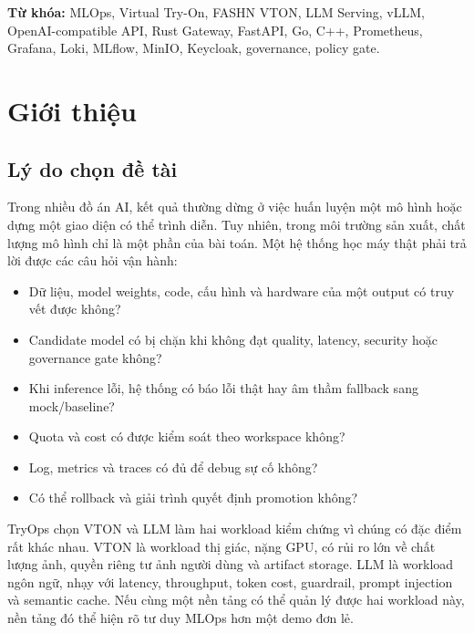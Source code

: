 \documentclass[12pt,a4paper,oneside]{report}
\begin{document}
\textbf{Từ khóa:} MLOps, Virtual Try-On, FASHN VTON, LLM Serving, vLLM, OpenAI-compatible API, Rust Gateway, FastAPI, Go, C++, Prometheus, Grafana, Loki, MLflow, MinIO, Keycloak, governance, policy gate.

\tableofcontents
\clearpage
{}

\chapter{Giới thiệu}

\section{Lý do chọn đề tài}

Trong nhiều đồ án AI, kết quả thường dừng ở việc huấn luyện một mô hình hoặc dựng một giao diện có thể trình diễn. Tuy nhiên, trong môi trường sản xuất, chất lượng mô hình chỉ là một phần của bài toán. Một hệ thống học máy thật phải trả lời được các câu hỏi vận hành:

\begin{itemize}
  \item Dữ liệu, model weights, code, cấu hình và hardware của một output có truy vết được không?
  \item Candidate model có bị chặn khi không đạt quality, latency, security hoặc governance gate không?
  \item Khi inference lỗi, hệ thống có báo lỗi thật hay âm thầm fallback sang mock/baseline?
  \item Quota và cost có được kiểm soát theo workspace không?
  \item Log, metrics và traces có đủ để debug sự cố không?
  \item Có thể rollback và giải trình quyết định promotion không?
\end{itemize}

TryOps chọn VTON và LLM làm hai workload kiểm chứng vì chúng có đặc điểm rất khác nhau. VTON là workload thị giác, nặng GPU, có rủi ro lớn về chất lượng ảnh, quyền riêng tư ảnh người dùng và artifact storage. LLM là workload ngôn ngữ, nhạy với latency, throughput, token cost, guardrail, prompt injection và semantic cache. Nếu cùng một nền tảng có thể quản lý được hai workload này, nền tảng đó thể hiện rõ tư duy MLOps hơn một demo đơn lẻ.
\end{document}
